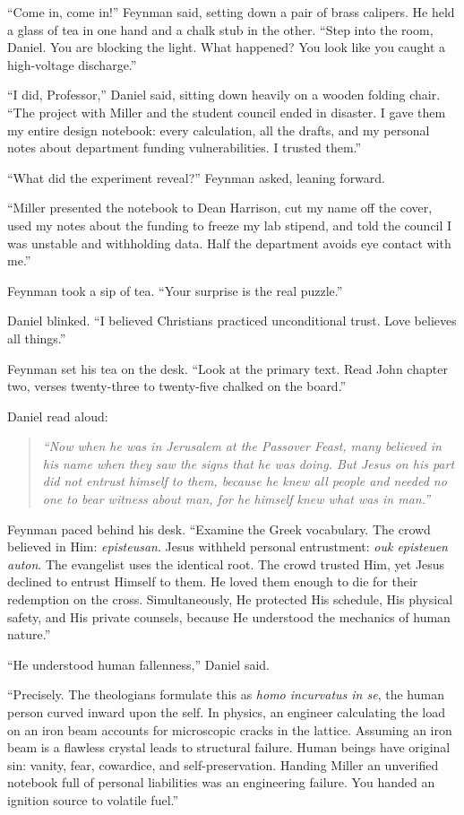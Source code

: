 \documentclass[11pt]{report}
\begin{document}
``Come in, come in!'' Feynman said, setting down a pair of brass calipers. He held a glass of tea in one hand and a chalk stub in the other. ``Step into the room, Daniel. You are blocking the light. What happened? You look like you caught a high-voltage discharge.''

``I did, Professor,'' Daniel said, sitting down heavily on a wooden folding chair. ``The project with Miller and the student council ended in disaster. I gave them my entire design notebook: every calculation, all the drafts, and my personal notes about department funding vulnerabilities. I trusted them.''

``What did the experiment reveal?'' Feynman asked, leaning forward.

``Miller presented the notebook to Dean Harrison, cut my name off the cover, used my notes about the funding to freeze my lab stipend, and told the council I was unstable and withholding data. Half the department avoids eye contact with me.''

Feynman took a sip of tea. ``Your surprise is the real puzzle.''

Daniel blinked. ``I believed Christians practiced unconditional trust. Love believes all things.''

Feynman set his tea on the desk. ``Look at the primary text. Read John chapter two, verses twenty-three to twenty-five chalked on the board.''

Daniel read aloud:
\begin{quote}
\textit{``Now when he was in Jerusalem at the Passover Feast, many believed in his name when they saw the signs that he was doing. But Jesus on his part did not entrust himself to them, because he knew all people and needed no one to bear witness about man, for he himself knew what was in man.''}
\end{quote}

Feynman paced behind his desk. ``Examine the Greek vocabulary. The crowd believed in Him: \textit{episteusan}. Jesus withheld personal entrustment: \textit{ouk episteuen auton}. The evangelist uses the identical root. The crowd trusted Him, yet Jesus declined to entrust Himself to them. He loved them enough to die for their redemption on the cross. Simultaneously, He protected His schedule, His physical safety, and His private counsels, because He understood the mechanics of human nature.''

``He understood human fallenness,'' Daniel said.

``Precisely. The theologians formulate this as \textit{homo incurvatus in se}, the human person curved inward upon the self. In physics, an engineer calculating the load on an iron beam accounts for microscopic cracks in the lattice. Assuming an iron beam is a flawless crystal leads to structural failure. Human beings have original sin: vanity, fear, cowardice, and self-preservation. Handing Miller an unverified notebook full of personal liabilities was an engineering failure. You handed an ignition source to volatile fuel.''
\end{document}
